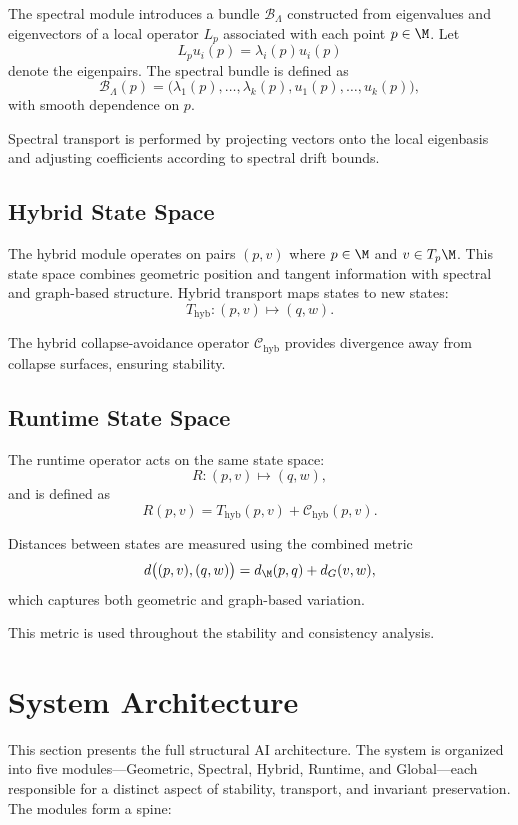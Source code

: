 \documentclass[11pt]{article}
\begin{document}
The spectral module introduces a bundle $\mathcal{B}_\Lambda$ constructed
from eigenvalues and eigenvectors of a local operator $L_p$ associated
with each point $p \in \M$. Let
\[
L_p u_i(p) = \lambda_i(p) u_i(p)
\]
denote the eigenpairs. The spectral bundle is defined as
\[
\mathcal{B}_\Lambda(p)
=
\big( \lambda_1(p), \ldots, \lambda_k(p),
      u_1(p), \ldots, u_k(p) \big),
\]
with smooth dependence on $p$.

Spectral transport is performed by projecting vectors onto the local
eigenbasis and adjusting coefficients according to spectral drift bounds.

\subsection{Hybrid State Space}

The hybrid module operates on pairs $(p,v)$ where $p \in \M$ and
$v \in T_p\M$. This state space combines geometric position and tangent
information with spectral and graph-based structure. Hybrid transport
maps states to new states:
\[
T_{\mathrm{hyb}} : (p,v) \mapsto (q,w).
\]

The hybrid collapse-avoidance operator $\mathcal{C}_{\mathrm{hyb}}$
provides divergence away from collapse surfaces, ensuring stability.

\subsection{Runtime State Space}

The runtime operator acts on the same state space:
\[
R : (p,v) \mapsto (q,w),
\]
and is defined as
\[
R(p,v)
=
T_{\mathrm{hyb}}(p,v)
+
\mathcal{C}_{\mathrm{hyb}}(p,v).
\]

Distances between states are measured using the combined metric
\[
d\big((p,v),(q,w)\big)
=
d_\M(p,q) + d_G(v,w),
\]
which captures both geometric and graph-based variation.

This metric is used throughout the stability and consistency analysis.

\section{System Architecture}

This section presents the full structural AI architecture. The system is
organized into five modules---Geometric, Spectral, Hybrid, Runtime, and
Global---each responsible for a distinct aspect of stability, transport,
and invariant preservation. The modules form a spine:
\end{document}
